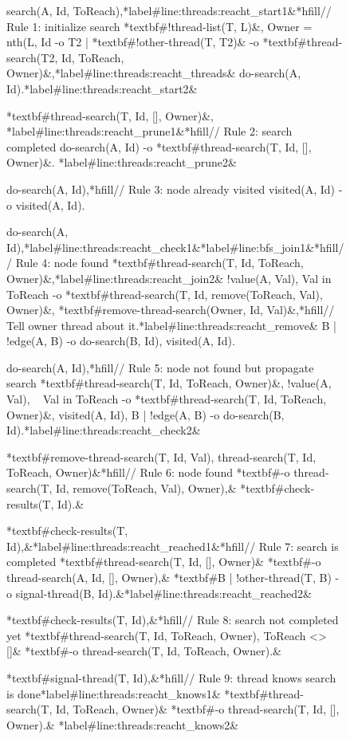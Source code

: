 \begin{figure}[h]
\begin{LineCode}[commandchars=*\#\&]
search(A, Id, ToReach),*label#line:threads:reacht_start1&*hfill// Rule 1: initialize search
*textbf#!thread-list(T, L)&, Owner = nth(L, Id %
   -o {T2 | *textbf#!other-thread(T, T2)& -o *textbf#thread-search(T2, Id, ToReach, Owner)&},*label#line:threads:reacht_threads&
      do-search(A, Id).*label#line:threads:reacht_start2&

*textbf#thread-search(T, Id, [], Owner)&, *label#line:threads:reacht_prune1&*hfill// Rule 2: search completed
do-search(A, Id)
   -o *textbf#thread-search(T, Id, [], Owner)&. *label#line:threads:reacht_prune2&

do-search(A, Id),*hfill// Rule 3: node already visited
visited(A, Id)
   -o visited(A, Id).

do-search(A, Id),*label#line:threads:reacht_check1&*label#line:bfs_join1&*hfill// Rule 4: node found
*textbf#thread-search(T, Id, ToReach, Owner)&,*label#line:threads:reacht_join2&
!value(A, Val), Val in ToReach
   -o *textbf#thread-search(T, Id, remove(ToReach, Val), Owner)&,
      *textbf#remove-thread-search(Owner, Id, Val)&,*hfill// Tell owner thread about it.*label#line:threads:reacht_remove&
      {B | !edge(A, B) -o do-search(B, Id)},
      visited(A, Id).

do-search(A, Id),*hfill// Rule 5: node not found but propagate search
*textbf#thread-search(T, Id, ToReach, Owner)&,
!value(A, Val), ~ Val in ToReach
   -o *textbf#thread-search(T, Id, ToReach, Owner)&,
      visited(A, Id),
      {B | !edge(A, B) -o do-search(B, Id)}.*label#line:threads:reacht_check2&

*textbf#remove-thread-search(T, Id, Val), thread-search(T, Id, ToReach, Owner)&*hfill// Rule 6: node found
   *textbf#-o thread-search(T, Id, remove(ToReach, Val), Owner),&
      *textbf#check-results(T, Id).&

*textbf#check-results(T, Id),&*label#line:threads:reacht_reached1&*hfill// Rule 7: search is completed
*textbf#thread-search(T, Id, [], Owner)&
   *textbf#-o thread-search(A, Id, [], Owner),&
      *textbf#{B | !other-thread(T, B) -o signal-thread(B, Id)}.&*label#line:threads:reacht_reached2&

 *textbf#check-results(T, Id),&*hfill// Rule 8: search not completed yet
 *textbf#thread-search(T, Id, ToReach, Owner), ToReach <> []&
   *textbf#-o thread-search(T, Id, ToReach, Owner).&

*textbf#signal-thread(T, Id),&*hfill// Rule 9: thread knows search is done*label#line:threads:reacht_knows1&
*textbf#thread-search(T, Id, ToReach, Owner)&
   *textbf#-o thread-search(T, Id, [], Owner).& *label#line:threads:reacht_knows2&
\end{LineCode}
\label{code:threads:reach_threads}
\end{figure}

